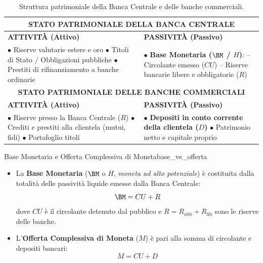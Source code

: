 \begin{table}[htbp]
\centering
\small
\renewcommand{\arraystretch}{1.3}
\begin{tabularx}{\textwidth}{X X}
\toprule
\multicolumn{2}{c}{\textbf{\textsf{\color{navyblue}STATO PATRIMONIALE DELLA BANCA CENTRALE}}} \\
\midrule
\textbf{ATTIVITÀ (Attivo)} & \textbf{PASSIVITÀ (Passivo)} \\
$\bullet$ Riserve valutarie estere e oro\newline
$\bullet$ Titoli di Stato / Obbligazioni pubbliche\newline
$\bullet$ Prestiti di rifinanziamento a banche ordinarie & 
$\bullet$ \textbf{Base Monetaria ($\BM$ / $H$)}:\newline
\quad -- Circolante emesso ($CU$)\newline
\quad -- Riserve bancarie libere e obbligatorie ($R$) \\
\midrule
\multicolumn{2}{c}{\textbf{\textsf{\color{purpleaccent}STATO PATRIMONIALE DELLE BANCHE COMMERCIALI}}} \\
\midrule
\textbf{ATTIVITÀ (Attivo)} & \textbf{PASSIVITÀ (Passivo)} \\
$\bullet$ Riserve presso la Banca Centrale ($R$)\newline
$\bullet$ Crediti e prestiti alla clientela (mutui, fidi)\newline
$\bullet$ Portafoglio titoli & 
$\bullet$ \textbf{Depositi in conto corrente della clientela ($D$)}\newline
$\bullet$ Patrimonio netto e capitale proprio \\
\bottomrule
\end{tabularx}
\caption{Struttura patrimoniale della Banca Centrale e delle banche commerciali.}
\label{tab:bilanci_bancari}
\end{table}

\begin{definizione}{Base Monetaria e Offerta Complessiva di Moneta}{base_vs_offerta}
\begin{itemize}
    \item La \textbf{Base Monetaria} ($\BM$ o $H$, \textit{moneta ad alto potenziale}) è costituita dalla totalità delle passività liquide emesse dalla Banca Centrale:
    \begin{equation}
        \BM = CU + R
    \end{equation}
    dove $CU$ è il circolante detenuto dal pubblico e $R = R_{\text{obb}} + R_{\text{lib}}$ sono le riserve delle banche.
    
    \item L'\textbf{Offerta Complessiva di Moneta} ($M$) è pari alla somma di circolante e depositi bancari:
    \begin{equation}
        M = CU + D
    \end{equation}
\end{itemize}
\end{definizione}

